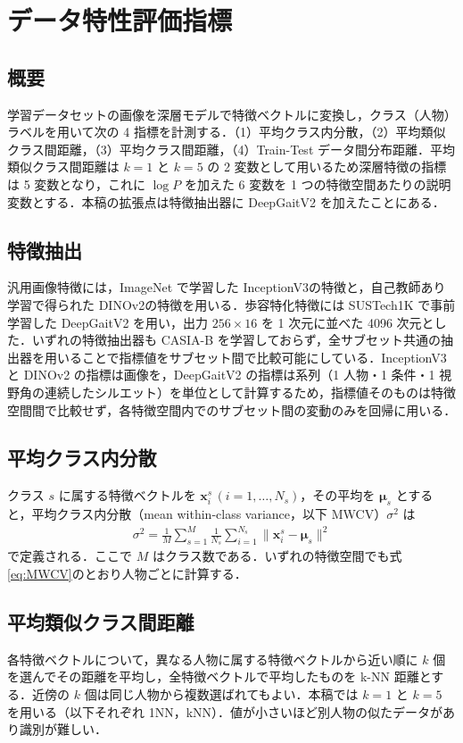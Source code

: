 \documentclass[technicalreport]{ieicej}
\begin{document}
\section{データ特性評価指標}
\subsection{概要}
学習データセットの画像を深層モデルで特徴ベクトルに変換し，クラス（人物）ラベルを用いて次の 4 指標を計測する．（1）平均クラス内分散，（2）平均類似クラス間距離，（3）平均クラス間距離，（4）Train-Test データ間分布距離．平均類似クラス間距離は $k=1$ と $k=5$ の 2 変数として用いるため深層特徴の指標は 5 変数となり，これに $\log P$ を加えた 6 変数を 1 つの特徴空間あたりの説明変数とする．本稿の拡張点は特徴抽出器に DeepGaitV2 を加えたことにある．

\subsection{特徴抽出}
汎用画像特徴には，ImageNet で学習した InceptionV3\cite{Szegedy_InceptionV3}の特徴と，自己教師あり学習で得られた DINOv2\cite{Oquab_DINOv2}の特徴を用いる．歩容特化特徴には SUSTech1K で事前学習した DeepGaitV2 を用い，出力 $256\times16$ を 1 次元に並べた 4096 次元とした．いずれの特徴抽出器も CASIA-B を学習しておらず，全サブセット共通の抽出器を用いることで指標値をサブセット間で比較可能にしている．InceptionV3 と DINOv2 の指標は画像を，DeepGaitV2 の指標は系列（1 人物・1 条件・1 視野角の連続したシルエット）を単位として計算するため，指標値そのものは特徴空間間で比較せず，各特徴空間内でのサブセット間の変動のみを回帰に用いる．

\subsection{平均クラス内分散}
クラス $s$ に属する特徴ベクトルを $\boldsymbol{x}_i^{s}\,(i=1,\dots,N_s)$，その平均を $\boldsymbol{\mu}_s$ とすると，平均クラス内分散（mean within-class variance，以下 MWCV）$\sigma^2$ は
\begin{align}
\sigma^2 = \frac{1}{M}\sum_{s=1}^{M}\frac{1}{N_s}\sum_{i=1}^{N_s}\|\boldsymbol{x}_i^{s}-\boldsymbol{\mu}_s\|^2
\label{eq:MWCV}
\end{align}
で定義される．ここで $M$ はクラス数である．いずれの特徴空間でも式\eqref{eq:MWCV}のとおり人物ごとに計算する．

\subsection{平均類似クラス間距離}
各特徴ベクトルについて，異なる人物に属する特徴ベクトルから近い順に $k$ 個を選んでその距離を平均し，全特徴ベクトルで平均したものを k-NN 距離とする．近傍の $k$ 個は同じ人物から複数選ばれてもよい．本稿では $k=1$ と $k=5$ を用いる（以下それぞれ 1NN，kNN）．値が小さいほど別人物の似たデータがあり識別が難しい．
\end{document}
